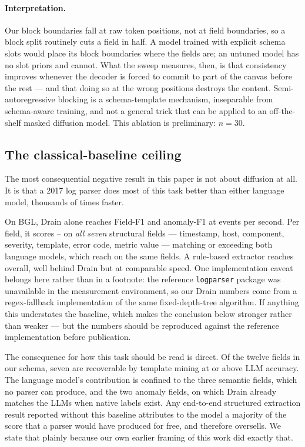\paragraph{Interpretation.} Our block boundaries fall at raw token positions,
not at field boundaries, so a block split routinely cuts a field in half. A
model trained with explicit schema slots would place its block boundaries where
the fields are; an untuned model has no slot priors and cannot. What the sweep
measures, then, is that consistency improves whenever the decoder is forced to
commit to part of the canvas before the rest --- and that doing so at the wrong
positions destroys the content. Semi-autoregressive blocking is a
schema-template mechanism, inseparable from schema-aware training, and not a
general trick that can be applied to an off-the-shelf masked diffusion model.
This ablation is preliminary: $n=30$.

\subsection{The classical-baseline ceiling}
\label{sec:neg-baselines}

The most consequential negative result in this paper is not about diffusion at
all. It is that a 2017 log parser does most of this task better than either
language model, thousands of times faster.

On BGL, Drain alone reaches \drainFOne{} Field-F1 and \drainAnomalyFOne{}
anomaly-F1 at \drainEvs{} events per second. Per field, it scores
\drainStructuralLo--\drainStructuralHi{} on \emph{all seven} structural fields
--- timestamp, host, component, severity, template, error code, metric value ---
matching or exceeding both language models, which reach
 on the same fields. A rule-based extractor
reaches  overall, well behind Drain but at comparable speed.
One implementation caveat belongs here rather than in a footnote: the reference
\texttt{logparser} package was unavailable in the measurement environment, so
our Drain numbers come from a regex-fallback implementation of the same
fixed-depth-tree algorithm. If anything this understates the baseline, which
makes the conclusion below stronger rather than weaker --- but the numbers
should be reproduced against the reference implementation before publication.

The consequence for how this task should be read is direct. Of the twelve
fields in our schema, seven are recoverable by template mining at or above LLM
accuracy. The language model's contribution is confined to the three semantic
fields, which no parser can produce, and the two anomaly fields, on which Drain
already matches the LLMs when native labels exist. Any end-to-end structured
extraction result reported without this baseline attributes to the model a
majority of the score that a parser would have produced for free, and therefore
oversells. We state that plainly because our own earlier framing of this work
did exactly that.

